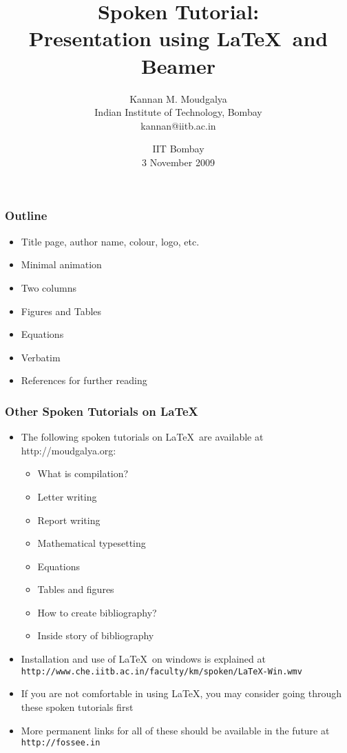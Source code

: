 \documentclass[handout]{beamer}
\begin{document}
\sffamily \bfseries

\title
[Presentation using \LaTeX\ and Beamer
\hspace{0.5cm}
\insertframenumber/\inserttotalframenumber]
{Spoken Tutorial: \\ Presentation using \LaTeX\ and
  Beamer}
\author
[Kannan Moudgalya]
{Kannan M. Moudgalya \\
  Indian Institute of Technology, Bombay \\
  kannan@iitb.ac.in}
\date{IIT Bombay \\
  3 November 2009}

\begin{frame}
   \titlepage
\end{frame}

\begin{frame}
\frametitle{Outline}
\begin{itemize}
\item Title page, author name, colour, logo, etc.
\item Minimal animation
\item Two columns
\item Figures and Tables
\item Equations
\item Verbatim
\item References for further reading
\end{itemize}
\end{frame}

\begin{frame}
\frametitle{Other Spoken Tutorials on  \LaTeX}
\begin{itemize}
\item The following spoken tutorials
  on \LaTeX\ are available at
  {\color{magenta}http://moudgalya.org}:
\begin{itemize}
\item What is compilation?
\item Letter writing
\item Report writing
\item Mathematical typesetting
\item Equations
\item Tables and figures
\item How to create bibliography?
\item Inside story of bibliography
\end{itemize}
\item Installation and use of \LaTeX\ on windows
  is explained at
{\color{magenta} \small \tt http://www.che.iitb.ac.in/faculty/km/spoken/LaTeX-Win.wmv}
\item If you are not comfortable in using \LaTeX,
  you may consider going through these spoken
  tutorials first
\item More permanent links for all of these should
  be available in the future at {\color{magenta}
    \tt http://fossee.in}
\end{itemize}
\end{frame}
\end{document}
